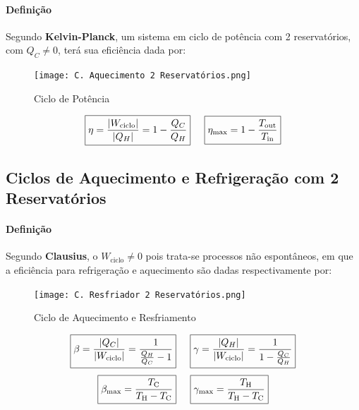 \documentclass{article}
\begin{document}
            \paragraph{Definição}Segundo \textbf{Kelvin-Planck}, um sistema em ciclo de potência com 2 reservatórios, com $Q_{C} \neq 0$, terá sua eficiência dada por:
                \begin{figure}[h]
                    \centering
                    \texttt{[image: C. Aquecimento 2 Reservatórios.png]}
                    \caption{Ciclo de Potência}
                \end{figure}
                \[
                    \boxed{
                        \eta =
                        \frac{|W_\text{ciclo}|}{|Q_{H}|} =
                        1 - \frac{Q_{C}}{Q_{H}}}
                    \hspace{5mm}
                    \boxed{
                        \eta_{\text{max}} =
                        1 - \frac{T_\text{{out}}}{T_\text{in}}}\]

        \subsection{Ciclos de Aquecimento e Refrigeração com 2 Reservatórios}
            \paragraph{Definição}Segundo \textbf{Clausius}, o $W_\text{ciclo} \neq 0$ pois trata-se processos não espontâneos, em que a eficiência para refrigeração e aquecimento são dadas respectivamente por:
                \begin{figure}[h]
                    \centering
                    \texttt{[image: C. Resfriador 2 Reservatórios.png]}
                    \caption{Ciclo de Aquecimento e Resfriamento}
                \end{figure}
                \[
                    \boxed{\beta = \frac{|Q_{C}|}{|W_\text{ciclo}|} = \frac{1}{\frac{Q_{H}}{Q_{C}} - 1}} \hspace{5mm}
                    \boxed{\gamma = \frac{|Q_{H}|}{|W_\text{ciclo}|} = \frac{1}{1 - \frac{Q_{C}}{Q_{H}}}}
                \]
                \[
                    \boxed{
                        \beta_{\text{max}} =
                        \frac{T_\text{C}}{T_\text{{H}} - T_\text{C}}}
                    \hspace{5mm}
                    \boxed{
                        \gamma_{\text{max}} =
                        \frac{T_\text{{H}}}{T_\text{{H}} - T_\text{C}}}
                \]
\newpage
\end{document}
